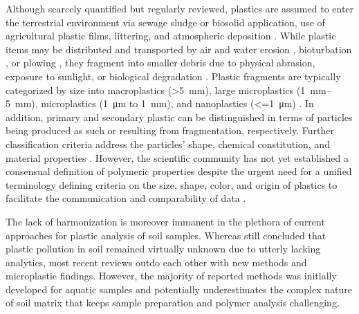 Although scarcely quantified but regularly reviewed, plastics are assumed to enter the terrestrial environment via sewage sludge or biosolid application, use of agricultural plastic films, littering, and atmospheric deposition \citep[Chapter~\ref{ch:plastic-mulching};][]{HurleyFate2018,WangMicroplastics2019,BiancoAtmospheric2020}. While plastic items may be distributed and transported by air and water erosion \citep{BergmannWhite2019}, bioturbation \citep{HuertaLwangaIncorporation2017,RilligMicroplastic2017a}, or plowing \citep{vandenBergSewage2020}, they fragment into smaller debris due to physical abrasion, exposure to sunlight, or biological degradation \citep{BriassoulisAnalysis2015,CaiObservation2018}.
Plastic fragments are typically categorized by size into macroplastics (\SI{>5}{\milli\meter}), large microplastics (\SIrange{1}{5}{\milli\meter}), microplastics (\SI{1}{\micro\meter} to \SI{1}{\milli\meter}), and nanoplastics (\SI{<=1}{\micro\meter}) \citep{BraunMicroplastics2018,HartmannAre2019}. In addition, primary and secondary plastic can be distinguished in terms of particles being produced as such or resulting from fragmentation, respectively.
Further classification criteria address the particles' shape, chemical constitution, and material properties \citep{HartmannAre2019}. However, the scientific community has not yet established a consensual definition of polymeric properties despite the urgent need for a unified terminology defining criteria on the size, shape, color, and origin of plastics to facilitate the communication and comparability of data \citep{HartmannAre2019}.

The lack of harmonization is moreover immanent in the plethora of current approaches for plastic analysis of soil samples. Whereas \citet{BlasingPlastics2018} still concluded that plastic pollution in soil remained virtually unknown due to utterly lacking analytics, most recent reviews \citep{MollerFinding2020,Dioses-SalinasMethodological2020} outdo each other with new methods and microplastic findings. However, the majority of reported methods was initially developed for aquatic samples and potentially underestimates the complex nature of soil matrix that keeps sample preparation and polymer analysis challenging.

